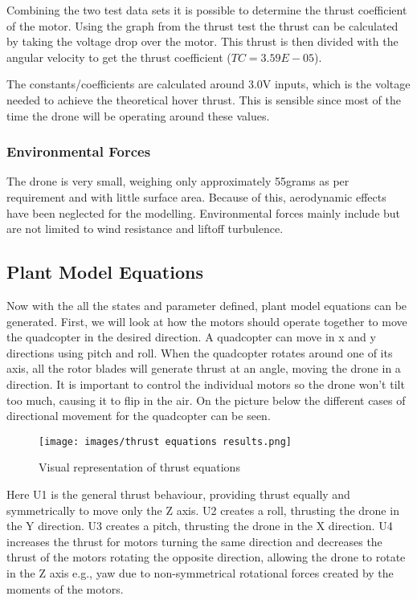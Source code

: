 \documentclass{article}
\begin{document}
Combining the two test data sets it is possible to determine the thrust coefficient of the motor. Using the graph from the thrust test the thrust can be calculated by taking the voltage drop over the motor. This thrust is then divided with the angular velocity to get the thrust coefficient ($TC=3.59E-05$).

The constants/coefficients are calculated around 3.0V inputs, which is the voltage needed to achieve the theoretical hover thrust. This is sensible since most of the time the drone will be operating around these values. 

\subsubsection{Environmental Forces}
The drone is very small, weighing only approximately 55grams as per requirement and with little surface area. Because of this, aerodynamic effects have been neglected for the modelling. Environmental forces mainly include but are not limited to wind resistance and liftoff turbulence.

\subsection{Plant Model Equations}
Now with the all the states and parameter defined, plant model equations can be generated. 
First, we will look at how the motors should operate together to move the quadcopter in the desired direction. A quadcopter can move in x and y directions using pitch and roll. When the quadcopter rotates around one of its axis, all the rotor blades will generate thrust at an angle, moving the drone in a direction. It is important to control the individual motors so the drone won’t tilt too much, causing it to flip in the air. On the picture below the different cases of directional movement for the quadcopter can be seen.  


\begin{figure}[H]
\begin{center}
   \texttt{[image: images/thrust equations results.png]}
\end{center}
\caption{Visual representation of thrust equations \cite{Ferry}}
\end{figure}

Here U1 is the general thrust behaviour, providing thrust equally and symmetrically to move only the Z axis. U2 creates a roll, thrusting the drone in the Y direction. U3 creates a pitch, thrusting the drone in the X direction. U4 increases the thrust for motors turning the same direction and decreases the thrust of the motors rotating the opposite direction, allowing the drone to rotate in the Z axis e.g., yaw due to non-symmetrical rotational forces created by the moments of the motors.  \cite{Ferry}
\end{document}
